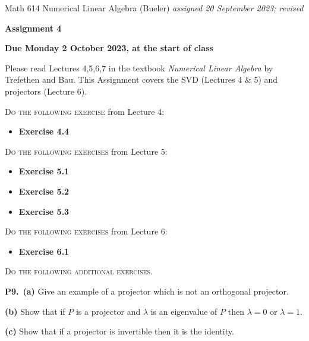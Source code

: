\documentclass[12pt]{amsart}
\newcommand{\prob}[1]{\bigskip\noindent\textbf{#1.}\quad }
\newcommand{\epart}[1]{\medskip\noindent\textbf{(#1)}\quad }
\newcommand{\ppart}[1]{\,\textbf{(#1)}\quad }
\begin{document}
\scriptsize \noindent Math 614 Numerical Linear Algebra (Bueler) \hfill \emph{assigned 20 September 2023; revised}
\normalsize\medskip

\Large\centerline{\textbf{Assignment 4}}
\large
\medskip

\centerline{\textbf{Due Monday 2 October 2023, at the start of class}}
\medskip
\normalsize

\thispagestyle{empty}

\bigskip
\noindent Please read Lectures 4,5,6,7 in the textbook \emph{Numerical Linear Algebra} by Trefethen and Bau.  This Assignment covers the SVD (Lectures 4 \& 5) and projectors (Lecture 6).

\bigskip
\noindent \textsc{Do the following exercise} from Lecture 4:

\begin{itemize}
\item \textbf{Exercise 4.4}
\end{itemize}

\bigskip
\noindent \textsc{Do the following exercises} from Lecture 5:

\begin{itemize}
\item \textbf{Exercise 5.1}
\item \textbf{Exercise 5.2}
\item \textbf{Exercise 5.3}
\end{itemize}

\bigskip
\noindent \textsc{Do the following exercises} from Lecture 6:

\begin{itemize}
\item \textbf{Exercise 6.1}
\end{itemize}


\bigskip
\noindent \textsc{Do the following additional exercises.}

\prob{P9}  \ppart{a} Give an example of a projector which is not an orthogonal projector.

\epart{b} Show that if $P$ is a projector and $\lambda$ is an eigenvalue of $P$ then $\lambda = 0$ or $\lambda = 1$.

\epart{c} Show that if a projector is invertible then it is the identity.
\end{document}
